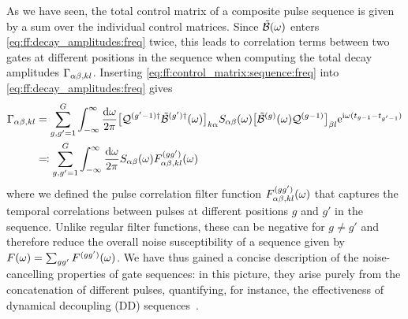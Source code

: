 As we have seen, the total control matrix of a composite pulse sequence is given by a sum over the individual control matrices.
Since $\tilde{\mathcal{B}}(\omega)$ enters \cref{eq:ff:decay_amplitudes:freq} twice, this leads to correlation terms between two gates at different positions in the sequence when computing the total decay amplitudes $\Gamma_{\alpha\beta,kl}$.
Inserting \cref{eq:ff:control_matrix:sequence:freq} into \cref{eq:ff:decay_amplitudes:freq} gives
\begin{equation}\label{eq:ff:decay_amplitudes:pulse_correlation}
\begin{split}
    \Gamma_{\alpha\beta,kl} &= \sum_{g,g'=1}^{G}\int_{-\infty}^\infty\frac{\dd{\omega}}{2\pi}
                                     \bigl[\mathcal{Q}^{(g'-1)\dagger}\tilde{\mathcal{B}}^{(g')\dagger}(\omega)\bigr]_{k\alpha}
                                     S_{\alpha\beta}(\omega)
                                     \bigl[\tilde{\mathcal{B}}^{(g)}(\omega)\mathcal{Q}^{(g-1)}\bigr]_{\beta l}
                                     \mathrm{e}^{\mathrm{i}\omega(t_{g-1} - t_{g'-1})} \\
                                &\eqqcolon\sum_{g,g'=1}^{G}\int_{-\infty}^\infty\frac{\dd{\omega}}{2\pi}
                                     S_{\alpha\beta}(\omega) F_{\alpha\beta,kl}^{(gg')}(\omega)
\end{split}
\end{equation}
where we defined the pulse correlation filter function $F_{\alpha\beta,kl}^{(gg')}(\omega)$ that captures the temporal correlations between pulses at different positions $g$ and $g'$ in the sequence.
Unlike regular filter functions, these can be negative for $g\neq g'$ and therefore reduce the overall noise susceptibility of a sequence given by $F(\omega) = \sum_{gg'}F^{(gg')}(\omega)$.
We have thus gained a concise description of the noise-cancelling properties of gate sequences: in this picture, they arise purely from the concatenation of different pulses, quantifying, for instance, the effectiveness of dynamical decoupling (DD) sequences~\cite{Cerfontaine2021}.

